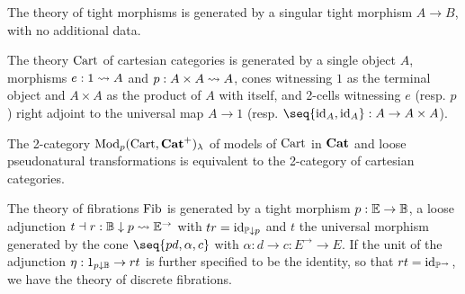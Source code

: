 \documentclass[../thesis.tex]{subfiles}
\begin{document}
  \begin{example}
    The theory of tight morphisms is generated by a singular tight morphism $A \to B$, with no additional
    data.
  \end{example}

  \begin{example}
    The theory ${\mathrm{Cart}}$ of cartesian categories is generated by a single object $A$, morphisms
    $e : 1 \rightsquigarrow A$ and $p : A \times A \rightsquigarrow A$, cones witnessing $1$ as the terminal object
    and $A \times A$ as the product of $A$ with itself, and 2-cells witnessing $e$ (resp. $p$)
    right adjoint to the universal map $A \to 1$ (resp. $\seq{\id_A, \id_A} : A \to A \times A$).

    The 2-category ${\mathrm{Mod}}_p({\mathrm{Cart}},{\mathbf{Cat}}^+)_\lambda$ of models of ${\mathrm{Cart}}$ in ${\mathbf{Cat}}$ and loose pseudonatural
    transformations is equivalent to the 2-category of cartesian categories. 
  \end{example}
  \begin{example}
    The theory of fibrations ${\mathrm{Fib}}$ is generated by a tight morphism $p : {\mathbb{E}} \to {\mathbb{B}}$, a loose adjunction $
    t \dashv r : {\mathbb{B}} \mathrel{\downarrow} p \rightsquigarrow {\mathbb{E}}^\to$ with $tr = \mathrm{id}_{{\mathbb{P}} \mathrel{\downarrow} p}$ and $t$ the universal morphism
    generated by the cone $\seq{p d, \alpha, c}$ with $\alpha : d \to c : E^\to \to E$. If the unit of the
    adjunction $\eta : 1_{p \mathrel{\downarrow} {\mathbb{B}}} \to rt$ is further specified to be the identity, so that $rt = \id_%
    {\bP^\to}$, we have the theory of discrete fibrations.
  \end{example}

  \ifSubfilesClassLoaded{\printbibliography}{}
\end{document}
